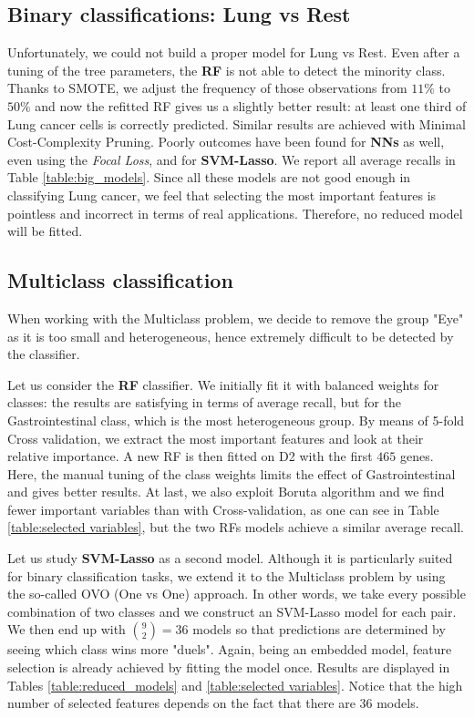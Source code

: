 \documentclass[a4paper,11pt, oneside]{article}  %
\begin{document}
\subsection{Binary classifications: Lung vs Rest}
Unfortunately,  we could not build a proper model for Lung vs Rest.  Even after a tuning of the tree parameters,  the \textbf{RF} is not able to detect the minority class.  Thanks to SMOTE, we adjust the frequency of those observations from $11\%$ to $50\%$ and now the refitted RF gives us a slightly better result: at least one third of Lung cancer cells is correctly predicted.  Similar results are achieved with Minimal Cost-Complexity Pruning. Poorly outcomes have been found for \textbf{NNs} as well, even using the \textit{Focal Loss}, and for \textbf{SVM-Lasso}. We report all average recalls in Table \ref{table:big_models}. Since all these models are not good enough in classifying Lung cancer, we feel that selecting the most important features is pointless and incorrect in terms of real applications. Therefore, no reduced model will be fitted.
\medskip

\subsection{Multiclass classification}
When working with the Multiclass problem, we decide to remove the group "Eye" as it is too small and heterogeneous, hence extremely difficult to be detected by the classifier. 
\medskip

Let us consider the \textbf{RF} classifier. We initially fit it with balanced weights for classes: the results are satisfying in terms of average recall, but for the Gastrointestinal class, which is the most heterogeneous group. By means of 5-fold Cross validation, we extract the most important features and look at their relative importance. A new RF is then fitted on D2 with the first $465$ genes. Here, the manual tuning of the class weights limits the effect of Gastrointestinal and gives better results.  At last, we also exploit Boruta algorithm and we find fewer important variables than with Cross-validation,  as one can see in Table \ref{table:selected variables},  but the two RFs models achieve a similar average recall.

Let us study \textbf{SVM-Lasso} as a second model.  Although it is particularly suited for binary classification tasks, we extend it to the Multiclass problem by using the so-called OVO (One vs One) approach. In other words, we take every possible combination of two classes and we construct an SVM-Lasso model for each pair. We then end up with $ \binom{9}{2} = 36$ models so that predictions are determined by seeing which class wins more "duels". Again,  being an embedded model, feature selection is already achieved by fitting the model once.  Results are displayed in Tables \ref{table:reduced_models} and \ref{table:selected variables}. Notice that the high number of selected features depends on the fact that there are 36 models.  
\end{document}
